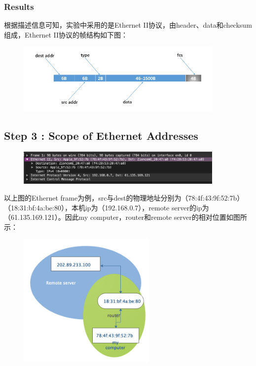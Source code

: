 \documentclass{article}
\begin{document}
  \subsubsection{Results}
  根据描述信息可知，实验中采用的是Ethernet II协议，由header、data和checksum组成，Ethernet II协议的帧结构如下图：
   \begin{figure}[H]
        \centering
        \includegraphics[width=0.9\textwidth]{img/exp123A.png}
        \caption{}
        \label{fig.4}
    \end{figure}
    
    \subsection{Step 3 : Scope of Ethernet Addresses}
    
      \begin{figure}[H]
        \centering
        \includegraphics[width=0.9\textwidth]{img/exp123B.png}
        \caption{}
        \label{fig.4}
    \end{figure}
    以上图的Ethernet frame为例，src与dest的物理地址分别为（78:4f:43:9f:52:7b）（18:31:bf:4a:be:80），本机ip为（192.168.0.7），remote server的ip为（61.135.169.121）。因此my computer，router和remote server的相对位置如图所示：
 

    \begin{figure}[H]
        \centering
        \includegraphics[width=0.6\textwidth]{img/exp123C.png} 
        \caption{}
        \label{fig.5}
    \end{figure}
    
\end{document}
